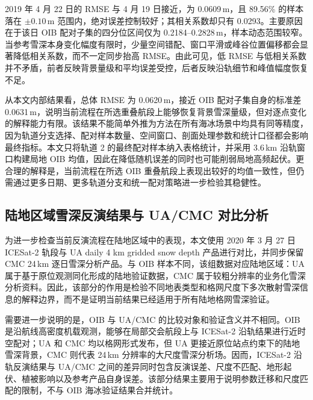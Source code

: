2019 年 4 月 22 日的 RMSE 与 4 月 19 日接近，为 0.0609\,m，且 89.56\% 的样本落在 $\pm 0.10$\,m 范围内，绝对误差控制较好；其相关系数却只有 0.0293。主要原因在于该日 OIB 配对子集的四分位区间仅为 0.2184--0.2828\,m，样本动态范围较窄。当参考雪深本身变化幅度有限时，少量空间错配、窗口平滑或峰谷位置偏移都会显著降低相关系数，而不一定同步抬高 RMSE。由此可见，低 RMSE 与低相关系数并不矛盾，前者反映背景量级和平均误差受控，后者反映沿轨细节和峰值幅度恢复不足。

从本文内部结果看，总体 RMSE 为 0.0620\,m，接近 OIB 配对子集自身的标准差 0.0631\,m，说明当前流程在所选重叠航段上能够恢复背景雪深量级，但对逐点变化的解释能力有限。该结果不能简单外推为方法在所有海冰场景中均具有同等精度，因为轨道分支选择、配对样本数量、空间窗口、剖面处理参数和统计口径都会影响最终指标。本文只将轨道 2 的最终配对样本纳入表格统计，并采用 3.6\,km 沿轨窗口构建局地 OIB 均值，因此在降低随机误差的同时也可能削弱局地高频起伏。更合理的解释是，当前流程在所选 OIB 重叠航段上表现出较好的均值一致性，但仍需通过更多日期、更多轨道分支和统一配对策略进一步检验其稳健性。

\FloatBarrier

\subsection{陆地区域雪深反演结果与 UA/CMC 对比分析}
为进一步检查当前反演流程在陆地区域中的表现，本文使用 2020 年 3 月 27 日 ICESat-2 轨段与 UA daily 4 km gridded snow depth 产品进行对比，并同步保留 CMC 24\,km 逐日雪深分析产品。与 OIB 样本不同，该组数据对应陆地区域：UA 属于基于原位观测同化形成的陆地验证数据，CMC 属于较粗分辨率的业务化雪深分析资料。因此，该部分的作用是检验不同地表类型和格网尺度下多次散射雪深信息的解释边界，而不是证明当前结果已经适用于所有陆地格网雪深验证。

需要进一步说明的是，OIB 与 UA/CMC 的比较对象和验证含义并不相同。OIB 是沿航线高密度机载观测，能够在局部交会航段上与 ICESat-2 沿轨结果进行近时空配对；UA 和 CMC 均以格网形式发布，但 UA 更接近原位站点约束下的陆地雪深背景，CMC 则代表 24\,km 分辨率的大尺度雪深分析场。因而，ICESat-2 沿轨反演结果与 UA/CMC 之间的差异同时包含反演误差、尺度不匹配、地形起伏、植被影响以及参考产品自身误差。该部分结果主要用于说明参数迁移和尺度匹配的限制，不与 OIB 海冰验证结果合并统计。

